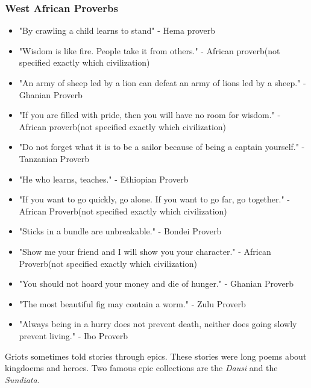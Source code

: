 \documentclass{article}
\begin{document}
\subsubsection{West African Proverbs}
\begin{itemize}
    \item "By crawling a child learns to stand" - Hema proverb
    \item "Wisdom is like fire. People take it from others." - African proverb(not specified exactly which civilization)
    \item "An army of sheep led by a lion can defeat an army of lions led by a sheep." - Ghanian Proverb
    \item "If you are filled with pride, then you will have no room for wisdom." - African proverb(not specified exactly which civilization)
    \item "Do not forget what it is to be a sailor because of being a captain yourself." - Tanzanian Proverb
    \item "He who learns, teaches." - Ethiopian Proverb
    \item "If you want to go quickly, go alone. If you want to go far, go together." - African Proverb(not specified exactly which civilization)
    \item "Sticks in a bundle are unbreakable." - Bondei Proverb
    \item "Show me your friend and I will show you your character." - African Proverb(not specified exactly which civilization)
    \item "You should not hoard your money and die of hunger." - Ghanian Proverb
    \item "The most beautiful fig may contain a worm." - Zulu Proverb
    \item "Always being in a hurry does not prevent death, neither does going slowly prevent living." - Ibo Proverb 
\end{itemize}
Griots sometimes told stories through epics. These stories were long poems about kingdoems and heroes. Two famous epic collections are the \textit{Dausi} and the \textit{Sundiata}.\\[5pt]
\end{document}

